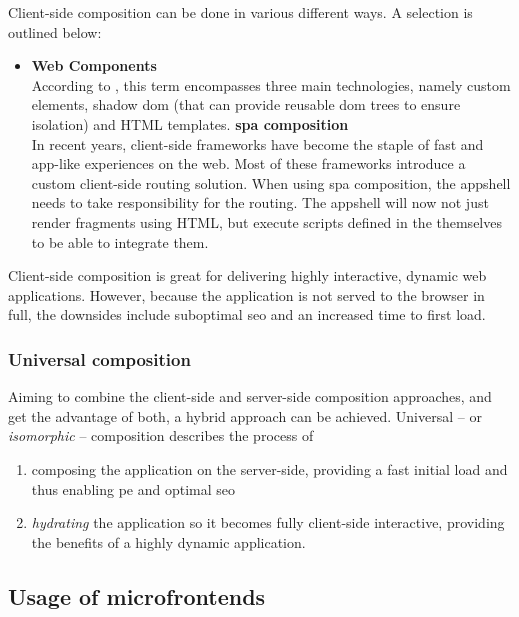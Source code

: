 Client-side composition can be done in various different ways. A selection is
outlined below:
\begin{itemize}
  \item \textbf{Web Components}\\
  According to \textcite{Mozilla_WebComponents}, this term encompasses three
  main technologies, namely custom elements, shadow \gls{dom} (that can provide
  reusable \gls{dom} trees to ensure isolation) and HTML templates.
  \spacedItem \textbf{\gls{spa} composition}\\
  In recent years, client-side frameworks have become the staple of fast and
  app-like experiences on the web. Most of these frameworks introduce a custom
  client-side routing solution. When using \gls{spa} composition, the
  \gls{appshell} needs to take responsibility for the routing. The
  \gls{appshell} will now not just render fragments using HTML, but execute
  scripts defined in the  themselves to be able to
  integrate them.
\end{itemize}

Client-side composition is great for delivering highly interactive, dynamic web
applications. However, because the application is not served to the browser in
full, the downsides include suboptimal \gls{seo} and an increased time to first
load.

\subsubsection{Universal composition}
\label{sssec:universal-composition}

Aiming to combine the client-side and server-side composition approaches, and
get the advantage of both, a hybrid approach can be achieved. Universal -- or
\textit{isomorphic} -- composition describes the process of 
\begin{enumerate}
  \item composing the application on the server-side, providing a fast initial
  load and thus enabling \gls{pe} and optimal \gls{seo}
  \item \textit{hydrating} the application so it becomes fully client-side
  interactive, providing the benefits of a highly dynamic application.
\end{enumerate}


\subsection{Usage of microfrontends}

